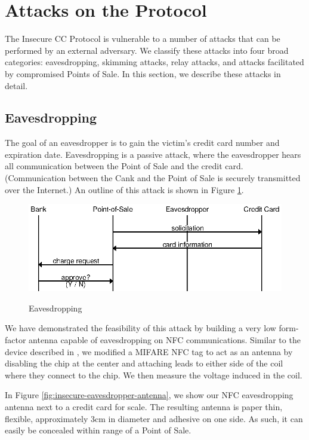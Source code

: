 \section{Attacks on the Protocol}
\label{sec:insecure-attacks}

The Insecure CC Protocol is vulnerable to a number of attacks that can be performed by an external adversary.
We classify these attacks into four broad categories:
    eavesdropping, skimming attacks, relay attacks, and attacks facilitated by compromised Points of Sale.
In this section, we describe these attacks in detail.


\subsection{Eavesdropping}
\label{sec:insecure-eavesdropper}
The goal of an eavesdropper is to gain the victim's credit card number and expiration date.
Eavesdropping is a passive attack, where the eavesdropper hears all communication between the Point of Sale and the credit card.
(Communication between the Cank and the Point of Sale is securely transmitted over the Internet.)
An outline of this attack is shown in Figure \ref{fig:insecure-eavesdropper}.

\begin{figure}
  \caption{Eavesdropping}
  \centering
    \includegraphics{img/attack-3-eavesdrop.eps}
  \label{fig:insecure-eavesdropper}
\end{figure}

We have demonstrated the feasibility of this attack by building a very low form-factor antenna capable of eavesdropping on NFC communications.
Similar to the device described in \cite{kortvedt2009eavesdropping}, we modified a MIFARE NFC tag to act as an antenna by disabling the chip at the center and attaching leads to either side of the coil where they connect to the chip.
We then measure the voltage induced in the coil.

In Figure \ref{fig:insecure-eavesdropper-antenna}, we show our NFC eavesdropping antenna next to a credit card for scale.
The resulting antenna is paper thin, flexible, approximately 3cm in diameter and adhesive on one side.
As such, it can easily be concealed within range of a Point of Sale.

